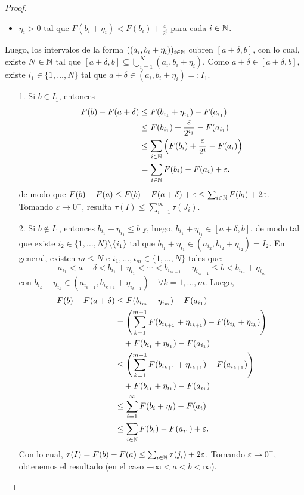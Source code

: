 \begin{proof}
\begin{itemize}
		\item $\eta_i > 0$ tal que $F(b_i + \eta_i) < F(b_i) + \frac{\varepsilon}{2^i}$ para cada $i \in \mathbb{N}$.
	\end{itemize}
	Luego, los intervalos de la forma $((a_i,b_i + \eta_i))_{i\in\mathbb{N}}$ cubren $[a + \delta, b]$, con lo cual, existe $N \in \mathbb{N}$ tal que $[a + \delta,b] \subseteq \bigcup_{i=1}^{N} (a_i, b_i + \eta_i)$. Como $a + \delta \in [a + \delta,b]$, existe $i_1 \in \{1,\dots,N\}$ tal que $a + \delta \in (a_i,b_i + \eta_i) =: I_1$.
	\begin{enumerate}
		\item[1.] Si $b \in I_1$, entonces
		\begin{align*}
			F(b) - F(a + \delta) &\leq F(b_{i_1} + \eta_{i_1}) - F(a_{i_1}) \\
			&\leq F(b_{i_1}) + \frac{\varepsilon}{2^{i_{1}}} - F(a_{i_{1}}) \\
			&\leq \sum_{i\in\mathbb{N}} \left(F(b_i) + \frac{\varepsilon}{2^i} - F(a_i)\right) \\
			&= \sum_{i\in\mathbb{N}} F(b_i) - F(a_i) + \varepsilon
		.\end{align*}
		de modo que $F(b) - F(a) \leq F(b) - F(a + \delta) + \varepsilon \leq \sum_{i\in\mathbb{N}}^{} F(b_i) + 2 \varepsilon$. Tomando $\varepsilon \longrightarrow 0^+$, resulta $\tau(I) \leq \sum_{i=1}^{\infty} \tau(J_i)$. \checkmark

		\item[2.] Si $b \not\in I_1$, entonces $b_{i_{1}} + \eta_{i_{1}} \leq b$ y, luego, $b_{i_{1}} + \eta_{i_{1}} \in [a+\delta,b]$, de modo tal que existe $i_{2} \in \{1,\dots,N\} \setminus \{i_{1}\}$ tal que $b_{i_{1}} + \eta_{i_{1}} \in (a_{i_{2}},b_{i_{2}}+\eta_{i_{2}}) = I_2$. En general, existen $m \leq N$ e $i_1,\dots,i_m \in \{1,\dots,N\}$ tales que:
		\[ a_{i_{1}} < a + \delta < b_{i_{1}} + \eta_{i_{1}} < \cdots < b_{i_{m-1}} - \eta_{i_{m-1}} \leq b < b_{i_m} + \eta_{i_m} \]
		con $b_{i_k} + \eta_{i_k} \in (a_{i_{k+1}}, b_{i_{k+1}} + \eta_{i_{k+1}}) \quad \forall k = 1,\dots,m$. Luego,
		\begin{align*}
			F(b) - F(a + \delta) &\leq F(b_{i_m} + \eta_{i_m}) - F(a_{i_1}) \\
			&= \left( \sum_{k=1}^{m-1} F(b_{i_{k+1}} + \eta_{i_{k+1}}) - F(b_{i_k} + \eta_{i_k}) \right) \\
			& \quad + F(b_{i_{1}} + \eta_{i_{1}}) - F(a_{i_{1}}) \\
			&\leq \left( \sum_{k=1}^{m-1} F(b_{i_{k+1}} + \eta_{i_{k+1}}) - F(a_{i_{k+1}}) \right) \\
			& \quad + F(b_{i_{1}} + \eta_{i_{1}}) - F(a_{i_{1}}) \\
			&\leq \sum_{i=1}^{\infty} F(b_i + \eta_i) - F(a_i) \\
			&\leq \sum_{i\in\mathbb{N}} F(b_i) - F(a_{i_{1}}) + \varepsilon
		.\end{align*}
		Con lo cual, $\tau(I) = F(b) - F(a) \leq \sum_{i\in\mathbb{N}} \tau(j_i) + 2\varepsilon$. Tomando $\varepsilon \longrightarrow 0^+$, obtenemos el resultado (en el caso $-\infty < a < b < \infty$).


\end{enumerate}
\end{proof}
